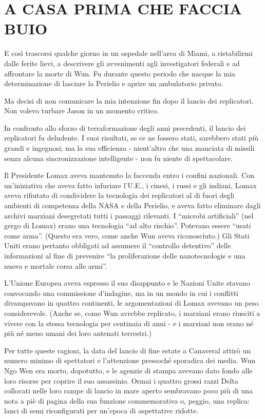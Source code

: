 \chapter{A CASA PRIMA CHE FACCIA BUIO}\label{a-casa-prima-che-faccia-buio}

\hfill\break

E così trascorsi qualche giorno in un ospedale nell'area di Miami, a
ristabilirmi dalle ferite lievi, a descrivere gli avvenimenti agli
investigatori federali e ad affrontare la morte di Wun. Fu durante
questo periodo che nacque la mia determinazione di lasciare la Perielio
e aprire un ambulatorio privato.

Ma decisi di non comunicare la mia intenzione fin dopo il lancio dei
replicatori. Non volevo turbare Jason in un momento critico.

\separatorefiori

In confronto allo sforzo di terraformazione degli anni precedenti, il
lancio dei replicatori fu deludente. I suoi risultati, se ce ne fossero
stati, sarebbero stati più grandi e ingegnosi; ma la sua efficienza -
nient'altro che una manciata di missili senza alcuna sincronizzazione
intelligente - non fu niente di spettacolare.

Il Presidente Lomax aveva mantenuto la faccenda entro i confini
nazionali. Con un'iniziativa che aveva fatto infuriare l'U.E., i cinesi,
i russi e gli indiani, Lomax aveva rifiutato di condividere la
tecnologia dei replicatori al di fuori degli ambienti di competenza
della NASA e della Perielio, e aveva fatto eliminare dagli archivi
marziani desegretati tutti i passaggi rilevanti. I ``microbi
artificiali'' (nel gergo di Lomax) erano una tecnologia ``ad alto
rischio''. Potevano essere ``usati come arma''. (Questo era vero, come
anche Wun aveva riconosciuto.) Gli Stati Uniti erano pertanto obbligati
ad assumere il ``controllo detentivo'' delle informazioni al fine di
prevenire ``la proliferazione delle nanotecnologie e una nuova e mortale
corsa alle armi''.

L'Unione Europea aveva espresso il suo disappunto e le Nazioni Unite
stavano convocando una commissione d'indagine, ma in un mondo in cui i
conflitti divampavano in quattro continenti, le argomentazioni di Lomax
avevano un peso considerevole. (Anche se, come Wun avrebbe replicato, i
marziani erano riusciti a vivere con la stessa tecnologia per centinaia
di anni - e i marziani non erano né più né meno umani dei loro antenati
terrestri.)

Per tutte queste ragioni, la data del lancio di fine estate a Canaveral
attirò un numero minimo di spettatori e l'attenzione pressoché sporadica
dei media. Wun Ngo Wen era morto, dopotutto, e le agenzie di stampa
avevano dato fondo alle loro risorse per coprire il suo assassinio.
Ormai i quattro grossi razzi Delta collocati nelle loro rampe di lancio
in mare aperto sembravano poco più di una nota a piè di pagina della sua
funzione commemorativa o, peggio, una replica: lanci di semi
riconfigurati per un'epoca di aspettative ridotte.

